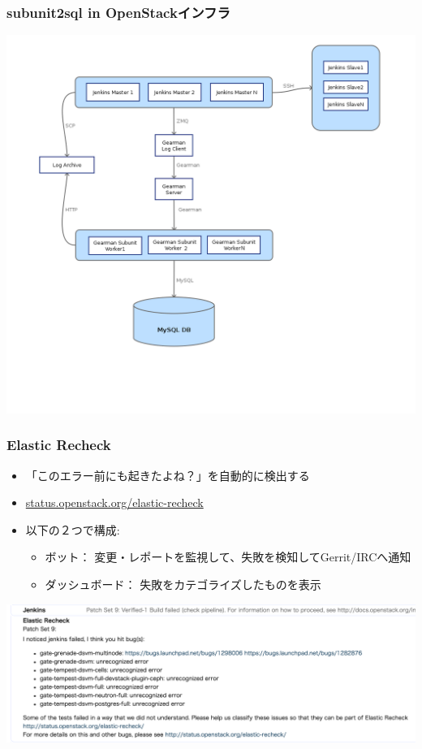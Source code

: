 \documentclass[aspectratio=169,11pt,hyperref={colorlinks=true}]{beamer}
\begin{document}
\begin{frame}
  \frametitle{subunit2sql in OpenStackインフラ}
  \begin{center}
    \includegraphics[height=1.1\textheight]{subunit2sql-collection.png}
  \end{center}
\end{frame}

\begin{frame}
  \frametitle{Elastic Recheck}
  \begin{itemize}
    \item 「このエラー前にも起きたよね？」を自動的に検出する
    \item \href{http://status.openstack.org/elastic-recheck/}{status.openstack.org/elastic-recheck}
    \item 以下の２つで構成:
      \begin{itemize}
        \item ボット： 変更・レポートを監視して、失敗を検知してGerrit/IRCへ通知
        \item ダッシュボード： 失敗をカテゴライズしたものを表示
      \end{itemize}
  \end{itemize}
  \begin{center}
    \includegraphics[width=.9\textwidth]{elastic-recheck-sample.png}
  \end{center}
\end{frame}
\end{document}
